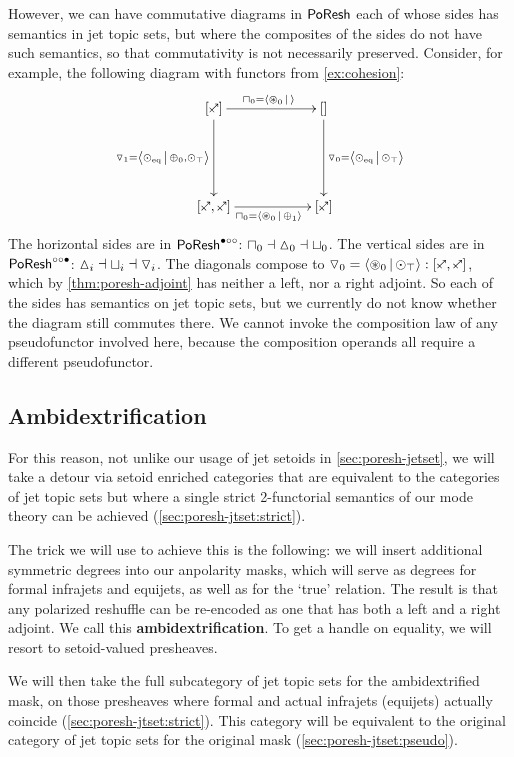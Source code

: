 \documentclass[a4paper]{memoir}
\begin{document}
However, we can have commutative diagrams in $\mathsf{PoResh}$ each of whose sides has semantics in jet topic sets, but where the composites of the sides do not have such semantics, so that commutativity is not necessarily preserved.
Consider, for example, the following diagram with functors from \cref{ex:cohesion}:
\[
	\xymatrix{
		[\ypolar]
			\ar[rr]^{\cohpi_0 = \reshlist{\isopol_0}{}}
			\ar[dd]_{\cohcodisc_1 = \reshlist{\nonpol_\eqtydeg}{\pospol_0, \nonpol_\top}}
		&&
		[]
			\ar[dd]^{\cohcodisc_0 = \reshlist{\nonpol_\eqtydeg}{\nonpol_\top}}
		\\ \\
		[\ypolar, \ypolar]
			\ar[rr]_{\cohpi_0 = \reshlist{\isopol_0}{\pospol_1}}
		&&
		[\ypolar]
	}
\]
The horizontal sides are in $\mathsf{PoResh}^{\bullet \circ \circ}$: ${\sqcap}_0 \dashv {\vartriangle}_0 \dashv {\sqcup}_0$.
The vertical sides are in $\mathsf{PoResh}^{\circ \circ \bullet}$: ${\vartriangle}_i \dashv {\sqcup}_i \dashv {\triangledown}_i$.
The diagonals compose to $\cohcodisc_0 = \reshlist{\isopol_0}{\nonpol_\top} : [\ypolar, \ypolar]$, which by \cref{thm:poresh-adjoint} has neither a left, nor a right adjoint.
So each of the sides has semantics on jet topic sets, but we currently do not know whether the diagram still commutes there.
We cannot invoke the composition law of any pseudofunctor involved here, because the composition operands all require a different pseudofunctor.

\subsection{Ambidextrification} \label{sec:poresh-jtset:ambidextrification}
For this reason, not unlike our usage of jet setoids in \cref{sec:poresh-jetset}, we will take a detour via setoid enriched categories that are equivalent to the categories of jet topic sets but where a single strict 2-functorial semantics of our mode theory can be achieved (\cref{sec:poresh-jtset:strict}).

The trick we will use to achieve this is the following: we will insert additional symmetric degrees into our anpolarity masks, which will serve as degrees for formal infrajets and equijets, as well as for the `true' relation.
The result is that any polarized reshuffle can be re-encoded as one that has both a left and a right adjoint. We call this \textbf{ambidextrification}.
To get a handle on equality, we will resort to setoid-valued presheaves.

We will then take the full subcategory of jet topic sets for the ambidextrified mask, on those presheaves where formal and actual infrajets (equijets) actually coincide (\cref{sec:poresh-jtset:strict}).
This category will be equivalent to the original category of jet topic sets for the original mask (\cref{sec:poresh-jtset:pseudo}).
\end{document}
